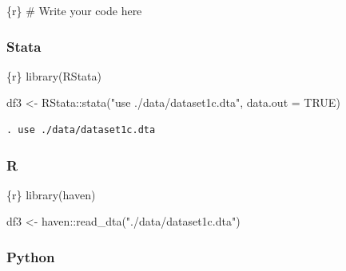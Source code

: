 \documentclass[
  letterpaper,
  DIV=11,
  numbers=noendperiod,
  oneside]{scrreprt}
\newenvironment{Shaded}{\begin{snugshade}}{\end{snugshade}}
\newcommand{\AttributeTok}[1]{\textcolor[rgb]{0.40,0.45,0.13}{#1}}
\newcommand{\CommentTok}[1]{\textcolor[rgb]{0.37,0.37,0.37}{#1}}
\newcommand{\ConstantTok}[1]{\textcolor[rgb]{0.56,0.35,0.01}{#1}}
\newcommand{\FunctionTok}[1]{\textcolor[rgb]{0.28,0.35,0.67}{#1}}
\newcommand{\InformationTok}[1]{\textcolor[rgb]{0.37,0.37,0.37}{#1}}
\newcommand{\NormalTok}[1]{\textcolor[rgb]{0.00,0.23,0.31}{#1}}
\newcommand{\OtherTok}[1]{\textcolor[rgb]{0.00,0.23,0.31}{#1}}
\newcommand{\SpecialCharTok}[1]{\textcolor[rgb]{0.37,0.37,0.37}{#1}}
\newcommand{\StringTok}[1]{\textcolor[rgb]{0.13,0.47,0.30}{#1}}
\begin{document}
\begin{Shaded}
\begin{Highlighting}[]
\InformationTok{\textasciigrave{}\textasciigrave{}\textasciigrave{}\{r\}}
\CommentTok{\# Write your code here}
\InformationTok{\textasciigrave{}\textasciigrave{}\textasciigrave{}}
\end{Highlighting}
\end{Shaded}

\subsubsection{Stata}

\begin{Shaded}
\begin{Highlighting}[]
\InformationTok{\textasciigrave{}\textasciigrave{}\textasciigrave{}\{r\}}
\FunctionTok{library}\NormalTok{(RStata)}

\NormalTok{df3 }\OtherTok{\textless{}{-}}\NormalTok{ RStata}\SpecialCharTok{::}\FunctionTok{stata}\NormalTok{(}\StringTok{"use ./data/dataset1c.dta"}\NormalTok{,}
                     \AttributeTok{data.out =} \ConstantTok{TRUE}\NormalTok{)}
\InformationTok{\textasciigrave{}\textasciigrave{}\textasciigrave{}}
\end{Highlighting}
\end{Shaded}

\begin{verbatim}
. use ./data/dataset1c.dta
\end{verbatim}

\subsubsection{R}

\begin{Shaded}
\begin{Highlighting}[]
\InformationTok{\textasciigrave{}\textasciigrave{}\textasciigrave{}\{r\}}
\FunctionTok{library}\NormalTok{(haven)}

\NormalTok{df3 }\OtherTok{\textless{}{-}}\NormalTok{ haven}\SpecialCharTok{::}\FunctionTok{read\_dta}\NormalTok{(}\StringTok{"./data/dataset1c.dta"}\NormalTok{)}
\InformationTok{\textasciigrave{}\textasciigrave{}\textasciigrave{}}
\end{Highlighting}
\end{Shaded}

\subsubsection{Python}
\end{document}
